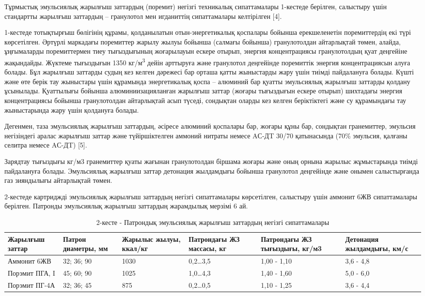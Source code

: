 \begin{multicols}{2}
Тұрмыстық эмульсиялық жарылғыш заттардың (поремит) негізгі техникалық
сипаттамалары 1-кестеде берілген, салыстыру үшін стандартты жарылғыш
заттардың -- гранулотол мен игданиттің сипаттамалары келтірілген
{[}4{]}.

1-кестеде тотықтырғыш бөлігінің құрамы, қолданылатын отын-энергетикалық
қоспалары бойынша ерекшеленетін поремиттердің екі түрі көрсетілген.
Әртүрлі маркадағы поремиттер жарылу жылуы бойынша (салмағы бойынша)
гранулотолдан айтарлықтай төмен, алайда, ұңғымаларды поремиттермен тиеу
тығыздығының жоғарылауын ескере отырып, энергия концентрациясы
гранулотолдың қуат деңгейіне жақындайды. Жүктеме тығыздығын 1350
кг/м\textsuperscript{3} дейін арттыруға және гранулотол деңгейінде
поремиттік энергия концентрациясын алуға болады. Бұл жарылғыш заттарды
судың кез келген дәрежесі бар орташа қатты жыныстарды жару үшін тиімді
пайдалануға болады. Күшті және өте берік тау жыныстары үшін құрамында
энергетикалық қоспа -- алюминий бар қуатты эмульсиялық жарылғыш заттарды
қолдану ұсынылады. Қуаттылығы бойынша алюминиизацияланған жарылғыш
заттар (жоғары тығыздығын ескере отырып) шихтадағы энергия
концентрациясы бойынша гранулотолдан айтарлықтай асып түседі, сондықтан
оларды кез келген беріктіктегі және су құрамындағы тау жыныстарында жару
үшін қолдануға болады.

Дегенмен, таза эмульсиялық жарылғыш заттардың, әсіресе алюминий
қоспалары бар, жоғары құны бар, сондықтан гранемиттер, эмульсия
негізіндегі аралас жарылғыш заттар және түйіршіктелген аммоний нитраты
немесе AС-ДT 30/70 қатынасында (70\% эмульсия, қалғаны селитра немесе
AС-ДT) {[}5{]}.

Зарядтау тығыздығы кг/м3 гранемиттер қуаты жағынан гранулотолдан біршама
жоғары және оның орнына жарылыс жұмыстарында тиімді пайдалануға болады.
Эмульсиялық жарылғыш заттар детонация жылдамдығы бойынша гранулотол
деңгейінде және онымен салыстырғанда газ зияндылығы айтарлықтай төмен.

2-кестеде картриджді эмульсиялық жарылғыш заттардың негізгі
сипаттамалары көрсетілген, салыстыру үшін аммонит 6ЖВ сипаттамалары
берілген. Патронды эмульсиялық жарылғыш заттардың жарамдылық мерзімі 6
ай.
\end{multicols}

\begin{table}[H]
\caption*{2-кесте - Патрондық эмульсиялық жарылғыш заттардың негізгі сипаттамалары}
\centering
\begin{tabular}{|l|p{}|p{}|p{}|p{}|p{}|}
\hline
Жарылғыш заттар & Патрон диаметры, мм & Жарылыс жылуы, ккал/кг & Патрондағы ЖЗ массасы, кг & Патрондағы ЖЗ тығыздығы, кг/м3 & Детонация жылдамдығы, км/с \\ \hline
Аммонит 6ЖВ & 32; 36; 90 & 1030 & 0,2…3,5 & 1,00 - 1,10 & 3,6 - 4,8 \\ \hline
Порэмит ПГА, I & 45; 60; 90 & 1025 & 1,0…4,3 & 1,40 - 1,60 & 5,0 - 6,0 \\ \hline
Порэмит ПГ-4А & 32; 36; 45 & 875 & 0,2…0,5 & 1,10 - 1,25 & 3,6 - 4,4 \\ \hline
\end{tabular}
\end{table}

